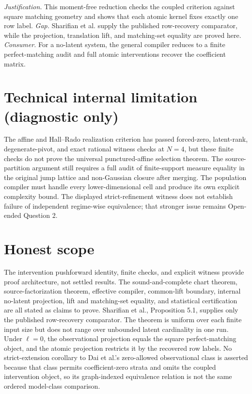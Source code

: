 \documentclass{article}
\begin{document}
\par\smallskip\noindent \textit{Justification.} This moment-free reduction checks the coupled criterion against square matching geometry and shows that each atomic kernel fixes exactly one row label. \textit{Gap.} Sharifian et al. supply the published row-recovery comparator, while the projection, translation lift, and matching-set equality are proved here. \textit{Consumer.} For a no-latent system, the general compiler reduces to a finite perfect-matching audit and full atomic interventions recover the coefficient matrix.

\section*{Technical internal limitation (diagnostic only)}

The affine and Hall--Rado realization criterion has passed forced-zero, latent-rank, degenerate-pivot, and exact rational witness checks at \(N=4\), but these finite checks do not prove the universal punctured-affine selection theorem. The source-partition argument still requires a full audit of finite-support measure equality in the original jump lattice and non-Gaussian closure after merging. The population compiler must handle every lower-dimensional cell and produce its own explicit complexity bound. The displayed strict-refinement witness does not establish failure of independent regime-wise equivalence; that stronger issue remains Open-ended Question 2.

\section{Honest scope}

The intervention pushforward identity, finite checks, and explicit witness provide proof architecture, not settled results. The sound-and-complete chart theorem, source-factorization theorem, effective compiler, common-lift boundary, internal no-latent projection, lift and matching-set equality, and statistical certification are all stated as claims to prove. Sharifian et al., Proposition 5.1, supplies only the published row-recovery comparator. The theorem is uniform over each finite input size but does not range over unbounded latent cardinality in one run. Under \(\ell=0\), the observational projection equals the square perfect-matching object, and the atomic projection restricts it by the recovered row labels. No strict-extension corollary to Dai et al.'s zero-allowed observational class is asserted because that class permits coefficient-zero strata and omits the coupled intervention object, so its graph-indexed equivalence relation is not the same ordered model-class comparison.
\end{document}
